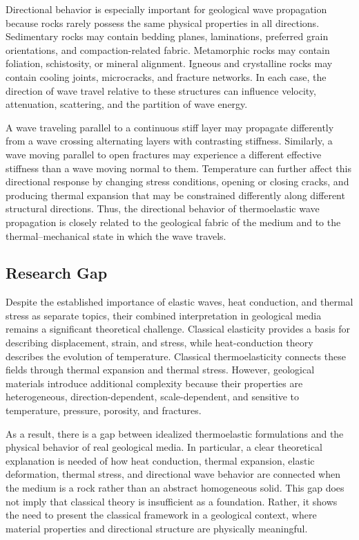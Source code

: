 \documentclass[12pt]{article}
\begin{document}
Directional behavior is especially important for geological wave propagation because rocks rarely possess the same physical properties in all directions. Sedimentary rocks may contain bedding planes, laminations, preferred grain orientations, and compaction-related fabric. Metamorphic rocks may contain foliation, schistosity, or mineral alignment. Igneous and crystalline rocks may contain cooling joints, microcracks, and fracture networks. In each case, the direction of wave travel relative to these structures can influence velocity, attenuation, scattering, and the partition of wave energy.

A wave traveling parallel to a continuous stiff layer may propagate differently from a wave crossing alternating layers with contrasting stiffness. Similarly, a wave moving parallel to open fractures may experience a different effective stiffness than a wave moving normal to them. Temperature can further affect this directional response by changing stress conditions, opening or closing cracks, and producing thermal expansion that may be constrained differently along different structural directions. Thus, the directional behavior of thermoelastic wave propagation is closely related to the geological fabric of the medium and to the thermal--mechanical state in which the wave travels.

\subsection{Research Gap}

Despite the established importance of elastic waves, heat conduction, and thermal stress as separate topics, their combined interpretation in geological media remains a significant theoretical challenge. Classical elasticity provides a basis for describing displacement, strain, and stress, while heat-conduction theory describes the evolution of temperature. Classical thermoelasticity connects these fields through thermal expansion and thermal stress. However, geological materials introduce additional complexity because their properties are heterogeneous, direction-dependent, scale-dependent, and sensitive to temperature, pressure, porosity, and fractures.

As a result, there is a gap between idealized thermoelastic formulations and the physical behavior of real geological media. In particular, a clear theoretical explanation is needed of how heat conduction, thermal expansion, elastic deformation, thermal stress, and directional wave behavior are connected when the medium is a rock rather than an abstract homogeneous solid. This gap does not imply that classical theory is insufficient as a foundation. Rather, it shows the need to present the classical framework in a geological context, where material properties and directional structure are physically meaningful.
\end{document}
